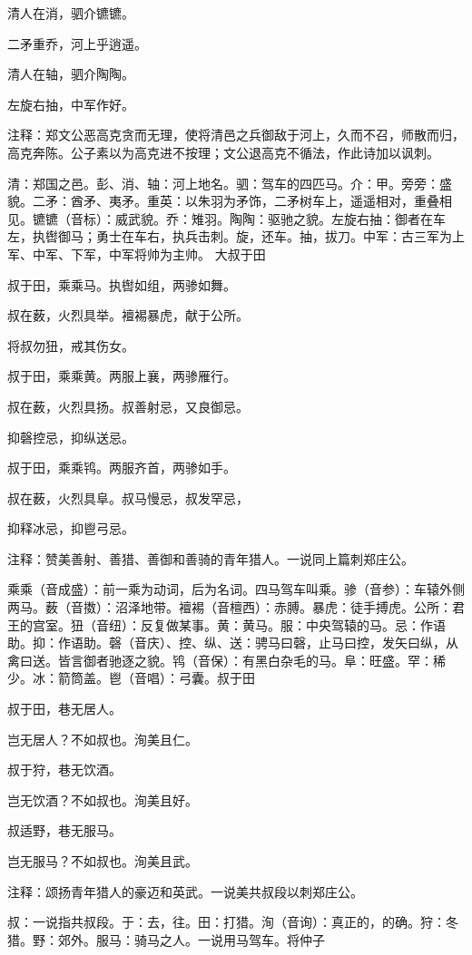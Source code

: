 \documentclass[12pt,UTF8]{ctexbook}
\begin{document}
清人在消，驷介镳镳。

二矛重乔，河上乎逍遥。

清人在轴，驷介陶陶。

左旋右抽，中军作好。

注释：郑文公恶高克贪而无理，使将清邑之兵御敌于河上，久而不召，师散而归，高克奔陈。公子素以为高克进不按理；文公退高克不循法，作此诗加以讽刺。

清：郑国之邑。彭、消、轴：河上地名。驷：驾车的四匹马。介：甲。旁旁：盛貌。二矛：酋矛、夷矛。重英：以朱羽为矛饰，二矛树车上，遥遥相对，重叠相见。镳镳（音标）：威武貌。乔：雉羽。陶陶：驱驰之貌。左旋右抽：御者在车左，执辔御马；勇士在车右，执兵击刺。旋，还车。抽，拔刀。中军：古三军为上军、中军、下军，中军将帅为主帅。 大叔于田

叔于田，乘乘马。执辔如组，两骖如舞。

叔在薮，火烈具举。襢裼暴虎，献于公所。

将叔勿狃，戒其伤女。

叔于田，乘乘黄。两服上襄，两骖雁行。

叔在薮，火烈具扬。叔善射忌，又良御忌。

抑磬控忌，抑纵送忌。

叔于田，乘乘鸨。两服齐首，两骖如手。

叔在薮，火烈具阜。叔马慢忌，叔发罕忌，

抑释冰忌，抑鬯弓忌。

注释：赞美善射、善猎、善御和善骑的青年猎人。一说同上篇刺郑庄公。

乘乘（音成盛）：前一乘为动词，后为名词。四马驾车叫乘。骖（音参）：车辕外侧两马。薮（音擞）：沼泽地带。襢裼（音檀西）：赤膊。暴虎：徒手搏虎。公所：君王的宫室。狃（音纽）：反复做某事。黄：黄马。服：中央驾辕的马。忌：作语助。抑：作语助。磬（音庆）、控、纵、送：骋马曰磬，止马曰控，发矢曰纵，从禽曰送。皆言御者驰逐之貌。鸨（音保）：有黑白杂毛的马。阜：旺盛。罕：稀少。冰：箭筒盖。鬯（音唱）：弓囊。叔于田

叔于田，巷无居人。

岂无居人？不如叔也。洵美且仁。

叔于狩，巷无饮酒。

岂无饮酒？不如叔也。洵美且好。

叔适野，巷无服马。

岂无服马？不如叔也。洵美且武。

注释：颂扬青年猎人的豪迈和英武。一说美共叔段以刺郑庄公。

叔：一说指共叔段。于：去，往。田：打猎。洵（音询）：真正的，的确。狩：冬猎。野：郊外。服马：骑马之人。一说用马驾车。将仲子
\end{document}
